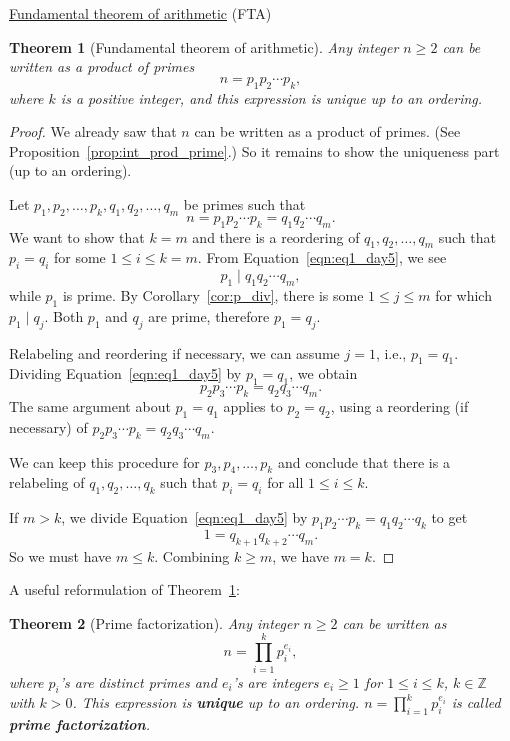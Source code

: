 \documentclass{amsbook}
\theoremstyle{plain}
\newtheorem{theorem}{Theorem}[chapter] %
\theoremstyle{definition}
\theoremstyle{remark}
\numberwithin{equation}{chapter}
\numberwithin{figure}{chapter}
\begin{document}
\underline{Fundamental theorem of arithmetic} (FTA)
\begin{theorem}[Fundamental theorem of arithmetic]\label{thm:fta}
Any integer $n \geqslant 2$ can be written as a product of primes 
\[
n = p_1p_2 \cdots p_k,
\]
where $k$ is a positive integer, and this expression is unique up to an ordering.
\end{theorem}
\begin{proof}
  We already saw that $n$ can be written as a product of primes. (See Proposition~\ref{prop:int_prod_prime}.) So it remains to show the uniqueness part (up to an ordering).

  Let $p_1, p_2, \ldots, p_k, q_1, q_2, \ldots, q_m$ be primes such that
\begin{equation}\label{eqn:eq1_day5}
    n = p_1 p_2 \cdots p_k = q_1 q_2 \cdots q_m.
\end{equation}
We want to show that $k = m$ and there is a reordering of $q_1, q_2, \ldots, q_m$ such that $p_i = q_i$ for some $1 \leqslant i \leqslant k = m$. From Equation~\eqref{eqn:eq1_day5}, we see
\[
  p_1 \mid q_1 q_2 \cdots q_m, 
\]
while $p_1$ is prime. By Corollary~\ref{cor:p_div}, there is some $1 \leqslant j \leqslant m$ for which $p_1 \mid q_j$. Both $p_1$ and $q_j$ are prime, therefore $p_1 = q_j$.

Relabeling and reordering if necessary, we can assume $j = 1$, i.e., $p_1 = q_1$. Dividing Equation~\eqref{eqn:eq1_day5} by $p_1 = q_1$, we obtain
\[
  p_2 p_3 \cdots p_k = q_2 q_3 \cdots q_m.
\]
The same argument about $p_1 = q_1$ applies to $p_2 = q_2$, using a reordering (if necessary) of $p_2 p_3 \cdots p_k = q_2 q_3 \cdots q_m$.

We can keep this procedure for $p_3, p_4, \ldots, p_k$ and conclude that there is a relabeling of $q_1, q_2, \ldots, q_k$ such that $p_i = q_i$ for all $1 \leqslant i \leqslant k$.

If $m > k$, we divide Equation~\eqref{eqn:eq1_day5} by $p_1 p_2 \cdots p_k = q_1 q_2 \cdots q_k$ to get
\[
  1 = q_{k+1} q_{k+2} \cdots q_m.
\]
So we must have $m \leqslant k$. Combining $k \geqslant m$, we have $m = k$.
\end{proof}

A useful reformulation of Theorem~\ref{thm:fta}:
\begin{theorem}[Prime factorization]\label{thm:fta_factor}
  Any integer $n \geqslant 2$ can be written as
  \[
    n = \prod_{i = 1}^k p_i^{e_i},
  \]
  where $p_i$'s are distinct primes and $e_i$'s are integers $e_i \geqslant 1$ for $1 \leqslant i \leqslant k$, $k \in \mathbb{Z}$ with $k > 0$. This expression is \textbf{unique} up to an ordering. $n = \prod_{i = 1}^k p_i^{e_i}$ is called \textbf{prime factorization}.
\end{theorem}
\end{document}
